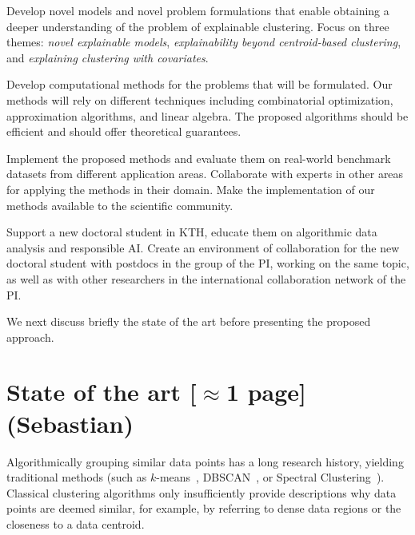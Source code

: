 \documentclass[a4paper,11pt]{article}
\begin{document}
\vspace{-2mm}
\begin{description}
\setlength{\itemsep}{-4pt}
\item[{Models and problems:}]
Develop novel models and novel problem formulations that enable 
obtaining a deeper understanding of the problem of explainable clustering.
Focus on three themes: 
\emph{novel explainable models}, 
\emph{explainability beyond centroid-based clustering}, and 
\emph{explaining clustering with covariates}.

\item[{Algorithms:}]
Develop computational methods for the problems that will be formulated.
Our methods will rely on different techniques
including combinatorial optimization, approximation algorithms, and linear algebra.
The proposed algorithms should be efficient and should offer theoretical guarantees.

\item[{Empirical evaluation and outreach:}]
Implement the proposed methods and evaluate them on 
real-world benchmark datasets from different application areas.
Collaborate with experts in other areas for applying the methods in their domain.
Make the implementation of our methods available to the scientific community.

\item[{Education in KTH:}]
Support a new doctoral student in KTH, 
educate them on algorithmic data analysis and responsible AI. 
Create an environment of collaboration for the new doctoral student 
with postdocs in the group of the PI, working on the same topic, 
as well as with other researchers in the international collaboration network of the PI.
\end{description}

\vspace{-2mm}
\noindent
We next discuss briefly the state of the art
before presenting the proposed approach.

\section{State of the art {\color{orange}[$\approx$1 page]} {\color{teal}(Sebastian)}}


Algorithmically grouping similar data points has a long research history,
yielding traditional methods (such as $k$-means~\cite{todo}, DBSCAN~\cite{todo}, or Spectral Clustering~\cite{todo}).
Classical clustering algorithms only insufficiently provide descriptions why data points are deemed similar, 
for example, by referring to dense data regions or the closeness to a data centroid.
\end{document}
